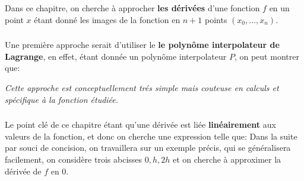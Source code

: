 \chapter*{}

Dans ce chapitre, on cherche à approcher \textbf{les dérivées} d'une fonction \(f\) en un point \(x\) étant donné les images de la fonction en \(n + 1\) points \((x_0, \ldots, x_n)\).

\subsection*{}
Une première approche serait d'utiliser le \textbf{le polynôme interpolateur de Lagrange}, en effet, étant donnée un polynôme interpolateur \(P\), on peut montrer que:
\begin{center}
   \textit{Cette approche est conceptuellement trés simple mais couteuse en calculs et spécifique à la fonction étudiée.}
\end{center}

\subsection*{}
Le point clé de ce chapitre étant qu'une dérivée est liée \textbf{linéairement} aux valeurs de la fonction, et donc on cherche une expression telle que:
Dans la suite par souci de concision, on travaillera sur un exemple précis, qui se généralisera facilement, on considère trois abcisses \(0, h, 2h\) et on cherche à approximer la dérivée de \(f\) en \(0\).\<

